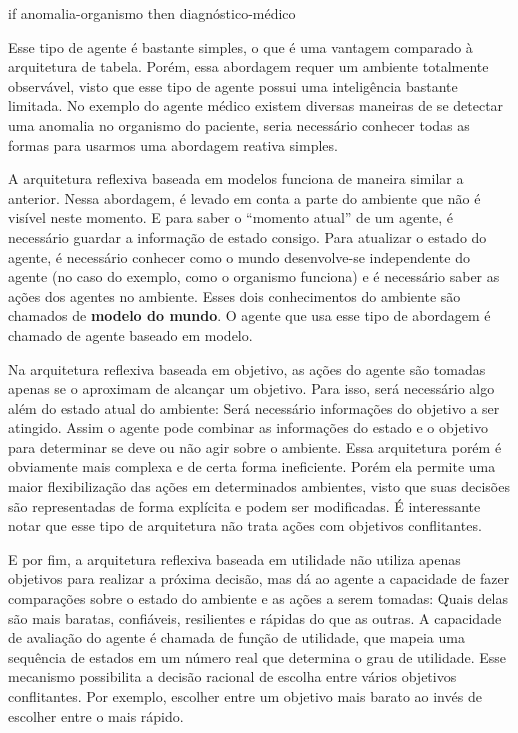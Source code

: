 if anomalia-organismo then diagnóstico-médico

Esse tipo de agente é bastante simples, o que é uma vantagem comparado à arquitetura de tabela. Porém, essa abordagem requer um ambiente totalmente observável, visto que esse tipo de agente possui uma inteligência bastante limitada. No exemplo do agente médico existem diversas maneiras de se detectar uma anomalia no organismo do paciente, seria necessário conhecer todas as formas para usarmos uma abordagem reativa simples.

A arquitetura reflexiva baseada em modelos funciona de maneira similar a anterior. Nessa abordagem, é levado em conta a parte do ambiente que não é visível neste momento. E para saber o ``momento atual'' de um agente, é necessário guardar a informação de estado consigo. Para atualizar o estado do agente, é necessário conhecer como o mundo desenvolve-se independente do agente (no caso do exemplo, como o organismo funciona) e é necessário saber as ações dos agentes no ambiente. Esses dois conhecimentos do ambiente são chamados de \textbf{modelo do mundo}. O agente que usa esse tipo de abordagem é chamado de agente baseado em modelo.

Na arquitetura reflexiva baseada em objetivo, as ações do agente são tomadas apenas se o aproximam de alcançar um objetivo. Para isso, será necessário algo além do estado atual do ambiente: Será necessário informações do objetivo a ser atingido. Assim o agente pode combinar as informações do estado e o objetivo para determinar se deve ou não agir sobre o ambiente. Essa arquitetura porém é obviamente mais complexa e de certa forma ineficiente. Porém ela permite uma maior flexibilização das ações em determinados ambientes, visto que suas decisões são representadas de forma explícita e podem ser modificadas. É interessante notar que esse tipo de arquitetura não trata ações com objetivos conflitantes.

E por fim, a arquitetura reflexiva baseada em utilidade não utiliza apenas objetivos para realizar a próxima decisão, mas dá ao agente a capacidade de fazer comparações sobre o estado do ambiente e as ações a serem tomadas: Quais delas são mais baratas, confiáveis, resilientes e rápidas do que as outras. A capacidade de avaliação do agente é chamada de função de utilidade, que mapeia uma sequência de estados em um número real que determina o grau de utilidade. Esse mecanismo possibilita a decisão racional de escolha entre vários objetivos conflitantes. Por exemplo, escolher entre um objetivo mais barato ao invés de escolher entre o mais rápido.

